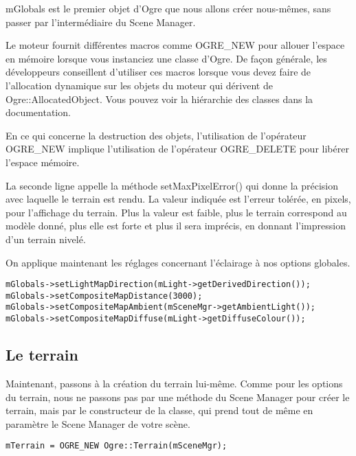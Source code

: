 \documentclass[10pt,a4paper]{report}
\begin{document}
mGlobals est le premier objet d'Ogre que nous allons cr\'eer nous-m\^emes, sans passer par l'interm\'ediaire du Scene Manager.

Le moteur fournit diff\'erentes macros comme OGRE\_NEW pour allouer l'espace en m\'emoire lorsque vous instanciez une classe d'Ogre. De fa\c{c}on g\'en\'erale, les d\'eveloppeurs conseillent d'utiliser ces macros lorsque vous devez faire de l'allocation dynamique sur les objets du moteur qui d\'erivent de Ogre::AllocatedObject. Vous pouvez voir la hi\'erarchie des classes dans la documentation.

En ce qui concerne la destruction des objets, l'utilisation de l'op\'erateur OGRE\_NEW implique l'utilisation de l'op\'erateur OGRE\_DELETE pour lib\'erer l'espace m\'emoire.

La seconde ligne appelle la m\'ethode setMaxPixelError() qui donne la pr\'ecision avec laquelle le terrain est rendu. La valeur indiqu\'ee est l'erreur tol\'er\'ee, en pixels, pour l'affichage du terrain. Plus la valeur est faible, plus le terrain correspond au mod\`ele donn\'e, plus elle est forte et plus il sera impr\'ecis, en donnant l'impression d'un terrain nivel\'e.

On applique maintenant les r\'eglages concernant l'\'eclairage \`a nos options globales.

\begin{lstlisting}[caption={Application des r\'eglages}]
mGlobals->setLightMapDirection(mLight->getDerivedDirection());
mGlobals->setCompositeMapDistance(3000);
mGlobals->setCompositeMapAmbient(mSceneMgr->getAmbientLight());
mGlobals->setCompositeMapDiffuse(mLight->getDiffuseColour());
\end{lstlisting}




\subsection{Le terrain}


Maintenant, passons \`a la cr\'eation du terrain lui-m\^eme. Comme pour les options du terrain, nous ne passons pas par une m\'ethode du Scene Manager pour cr\'eer le terrain, mais par le constructeur de la classe, qui prend tout de m\^eme en param\`etre le Scene Manager de votre sc\`ene.

\begin{lstlisting}[caption={Cr\'eation du terrain}]
mTerrain = OGRE_NEW Ogre::Terrain(mSceneMgr);
\end{lstlisting}
\end{document}
